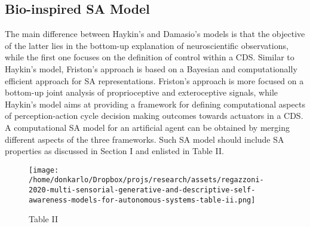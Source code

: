 \documentclass{article}
\begin{document}
		\subsection{Bio-inspired SA Model}
		The main difference between Haykin’s and Damasio’s models is that the objective of the latter lies in the bottom-up
		explanation of neuroscientific observations, while the first one
		focuses on the definition of control within a CDS. Similar
		to Haykin’s model, Friston’s approach is based on a Bayesian
		and computationally efficient approach for SA representations.
		Friston’s approach is more focused on a bottom-up joint analysis of proprioceptive and exteroceptive signals, while Haykin’s
		model aims at providing a framework for defining computational aspects of perception-action cycle decision making
		outcomes towards actuators in a CDS. A computational SA
		model for an artificial agent can be obtained by merging
		different aspects of the three frameworks. Such SA model
		should include SA properties as discussed in Section I and
		enlisted in \cite{regazzoni-2020-multi-sensorial-generative-and-descriptive-self-awareness-models-for-autonomous-systems}Table II.
		\begin{figure*}
			\centering
			\texttt{[image: /home/donkarlo/Dropbox/projs/research/assets/regazzoni-2020-multi-sensorial-generative-and-descriptive-self-awareness-models-for-autonomous-systems-table-ii.png]}
			\caption{\cite{regazzoni-2020-multi-sensorial-generative-and-descriptive-self-awareness-models-for-autonomous-systems} Table II}
			\label{fig:regazzoni-2020-multi-sensorial-generative-and-descriptive-self-awareness-models-for-autonomous-systems-table-ii.png}
		\end{figure*}
\end{document}

